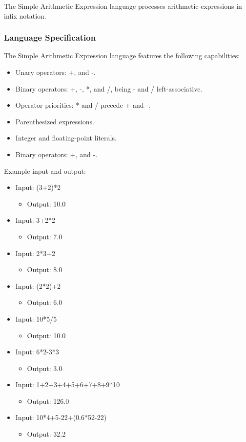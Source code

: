 \documentclass[a4paper,twoside,onecolumn]{article}
\begin{document}
The Simple Arithmetic Expression language processes arithmetic expressions in infix notation.

\subsubsection{Language Specification}
The Simple Arithmetic Expression language features the following capabilities:

\begin{itemize}
\item Unary operators: +, and -.
\item Binary operators: +, -, *, and /, being - and / left-associative.
\item Operator priorities: * and / precede + and -.
\item Parenthesized expressions.
\item Integer and floating-point literals.
\item Binary operators: +, and -.
\end{itemize}

Example input and output:  

\begin{itemize}
\item Input: (3+2)*2 
\begin{itemize} \item Output: 10.0 \end{itemize}
\item Input: 3+2*2 
\begin{itemize} \item Output: 7.0 \end{itemize}
\item Input: 2*3+2 
\begin{itemize} \item Output: 8.0 \end{itemize}
\item Input: (2*2)+2 
\begin{itemize} \item Output: 6.0 \end{itemize}
\item Input: 10*5/5 
\begin{itemize} \item Output: 10.0 \end{itemize}
\item Input: 6*2-3*3 
\begin{itemize} \item Output: 3.0 \end{itemize}
\item Input: 1+2+3+4+5+6+7+8+9*10 
\begin{itemize} \item Output: 126.0 \end{itemize}
\item Input: 10*4+5-22+(0.6*52-22) 
\begin{itemize} \item Output: 32.2 \end{itemize}
\end{itemize}
\end{document}
